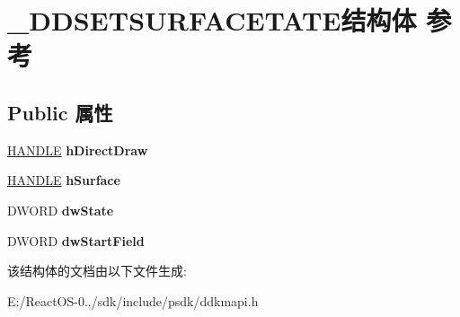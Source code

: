 \hypertarget{struct___d_d_s_e_t_s_u_r_f_a_c_e_t_a_t_e}{}\section{\+\_\+\+D\+D\+S\+E\+T\+S\+U\+R\+F\+A\+C\+E\+T\+A\+T\+E结构体 参考}
\label{struct___d_d_s_e_t_s_u_r_f_a_c_e_t_a_t_e}
\subsection*{Public 属性}
\begin{DoxyCompactItemize}
\item 
\mbox{\label{struct___d_d_s_e_t_s_u_r_f_a_c_e_t_a_t_e_a90a678f0d769765bbe6b13d1fde097c5}} 
\hyperlink{interfacevoid}{H\+A\+N\+D\+LE} {\bfseries h\+Direct\+Draw}
\item 
\mbox{\label{struct___d_d_s_e_t_s_u_r_f_a_c_e_t_a_t_e_ad967b5e3cf7a51851f84694550b53e69}} 
\hyperlink{interfacevoid}{H\+A\+N\+D\+LE} {\bfseries h\+Surface}
\item 
\mbox{\label{struct___d_d_s_e_t_s_u_r_f_a_c_e_t_a_t_e_a942ea5b872ad2fa34d920ad2c05efa32}} 
D\+W\+O\+RD {\bfseries dw\+State}
\item 
\mbox{\label{struct___d_d_s_e_t_s_u_r_f_a_c_e_t_a_t_e_a9acb7f674dbf76a5b270ae37c7e9e738}} 
D\+W\+O\+RD {\bfseries dw\+Start\+Field}
\end{DoxyCompactItemize}


该结构体的文档由以下文件生成\+:\begin{DoxyCompactItemize}
\item 
E\+:/\+React\+O\+S-\/0../sdk/include/psdk/ddkmapi.\+h\end{DoxyCompactItemize}
